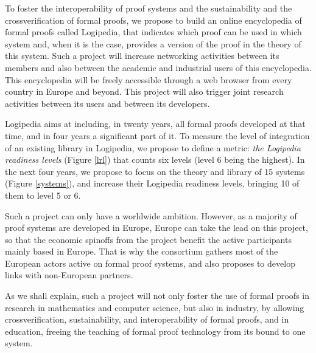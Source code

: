 To foster the interoperability of proof systems and the sustainability
and the crossverification of formal proofs, we propose to build an
online encyclopedia of formal proofs called {\sc Logipedia}, that
indicates which proof can be used in which system and, when it is the
case, provides a version of the proof in the theory of this system.
Such a project will increase networking activities between its members
and also between the academic and industrial users of this
encyclopedia.  This encyclopedia will be freely accessible through a
web browser from every country in Europe and beyond. This project will
also trigger joint research activities between its users and between
its developers.

{\sc Logipedia} aims at including, in twenty years, all formal proofs
developed at that time, and in four years a significant part of it. To
measure the level of integration of an existing library in {\sc
  Logipedia}, we propose to define a metric: {\em the {\sc Logipedia}
  readiness levels} (Figure \ref{lrl}) that counts six levels (level 6
being the highest).  In the next four years, we propose to focus on
the theory and library of 15 systems (Figure \ref{systems}), and
increase their {\sc Logipedia} readiness levels, bringing 10 of them
to level 5 or 6.

Such a project can only have a worldwide ambition. However, as a
majority of proof systems are developed in Europe, Europe can take the
lead on this project, so that the economic spinoffs from the project
benefit the active participants mainly based in Europe.  That is why
the consortium gathers most of the European actors active on formal
proof systems, and also proposes to develop links with non-European
partners.

As we shall explain, such a project will not only foster the use of
formal proofs in research in mathematics and computer science, but
also in industry, by allowing crossverification, sustainability, and
interoperability of formal proofs, and in education, freeing the
teaching of formal proof technology from its bound to one system. 


